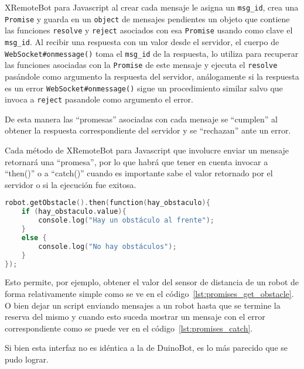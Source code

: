 XRemoteBot para Javascript al crear cada mensaje le asigna un \texttt{msg\_id},
crea una \texttt{Promise} y guarda en un \texttt{object} de mensajes
pendientes un objeto que contiene las funciones \texttt{resolve} y
\texttt{reject} asociados con esa \texttt{Promise}
usando como clave el \texttt{msg\_id}. Al recibir una respuesta
con un valor
desde el servidor, el cuerpo de \texttt{WebSocket\#onmessage()} toma el
\texttt{msg\_id} de la respuesta, lo utiliza para recuperar las funciones
asociadas con la \texttt{Promise} de este mensaje y ejecuta el
\texttt{resolve} pasándole como argumento la respuesta del servidor,
análogamente si la respuesta es un error \texttt{WebSocket\#onmessage()}
sigue un procedimiento similar salvo que invoca a \texttt{reject}
pasandole como argumento el error.

De esta manera las ``promesas'' asociadas con cada
mensaje se ``cumplen'' al obtener la respuesta correspondiente del servidor
y se ``rechazan'' ante un error.

Cada método de XRemoteBot para Javascript que involucre enviar un mensaje
retornará una ``promesa'', por lo que habrá que tener en cuenta
invocar a ``then()'' o a ``catch()'' cuando es importante
sabe el valor retornado por el servidor o si la ejecución fue exitosa.

\begin{lstlisting}[language=C,
caption={Implementación de \texttt{getObstacle()} con ``promesas''},
label=lst:promises_get_obstacle]
robot.getObstacle().then(function(hay_obstaculo){
    if (hay_obstaculo.value){
        console.log("Hay un obstáculo al frente");
    }
    else {
        console.log("No hay obstáculos");
    }
});
\end{lstlisting}



Esto permite, por ejemplo, obtener el valor del sensor de distancia de un
robot de forma relativamente simple como se ve en el
código~\ref{lst:promises_get_obstacle}.
O bien dejar un script enviando mensajes a un robot hasta que se
termine la reserva del mismo y cuando esto suceda mostrar un mensaje
con el error correspondiente como se puede ver en el
código~\ref{lst:promises_catch}.


Si bien esta interfaz no es idéntica a la de DuinoBot, es lo más parecido
que se pudo lograr.

